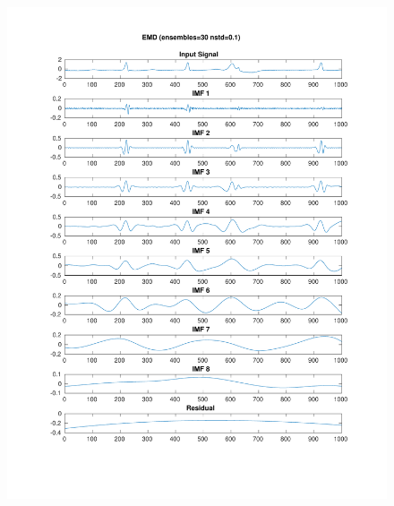 \documentclass[11pt,a4paper]{article}
\begin{document}
\begin{figure}[H]
\centering
\begin{minipage}{0.48\textwidth}
	\centering
	\includegraphics[width=\textwidth]{fig/221l1_emd_ensemble.pdf}
\end{minipage}
\begin{minipage}{0.48\textwidth}
	\centering

\end{minipage}
\end{figure}
\end{document}
